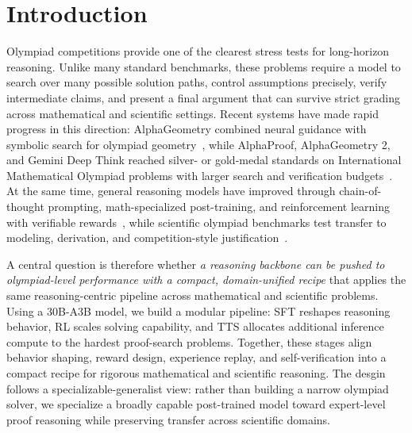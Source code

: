 \section{Introduction}
Olympiad competitions provide one of the clearest stress tests for long-horizon
reasoning. Unlike many standard benchmarks, these problems require a model to 
search over many possible solution paths, control assumptions precisely, verify
intermediate claims, and present a final argument that can survive strict
grading across mathematical and scientific settings. Recent systems have made
rapid progress in this direction: AlphaGeometry combined neural guidance with
symbolic search for olympiad geometry~\citep{trinh2024alphageometry}, while
AlphaProof, AlphaGeometry 2, and Gemini Deep Think reached silver- or
gold-medal standards on International Mathematical Olympiad problems with
larger search and verification budgets~\citep{deepmind2024alphaproof,deepmind2025geminiimo}.
At the same time, general reasoning models have improved through
chain-of-thought prompting, math-specialized post-training, and reinforcement
learning with verifiable rewards~\citep{wei2022chain,shao2024deepseekmath,yang2024qwen25math,r1,yan2025learning,exgrpo}, while scientific olympiad benchmarks test transfer to modeling, derivation, and competition-style justification~\citep{olympiadbench,chen2025p1,luo2026p1vl}.


A central question is therefore whether \textit{a reasoning backbone can be pushed to olympiad-level performance with a compact, domain-unified recipe} that
applies the same reasoning-centric pipeline across mathematical and scientific problems. 
Using
a 30B-A3B model, we build a modular pipeline: SFT reshapes reasoning behavior, RL scales solving capability, and TTS allocates additional inference compute to the
hardest proof-search problems. Together, these stages align behavior shaping, reward design, experience replay, and self-verification into a compact recipe for rigorous
mathematical and scientific reasoning. The desgin follows a specializable-generalist view: rather than building a narrow olympiad solver, we specialize a broadly capable post-trained model toward expert-level proof reasoning while preserving transfer across scientific domains.
  

